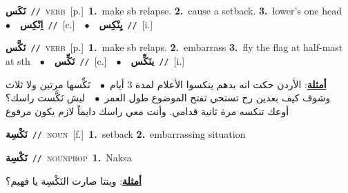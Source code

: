 \documentclass[10pt,a4paper,twoside]{article} %
\begin{document}
\begin{multicols}{2}
{\setlength\topsep{0pt}\textbf{\foreignlanguage{arabic}{نَكَس}}\ {\color{gray}\texttt{//}\color{black}}\ \textsc{verb}\ [p.]\ \textbf{1.}~make sb relapse.  \textbf{2.}~cause a setback.  \textbf{3.}~lower's one head\ \ $\bullet$\ \ \setlength\topsep{0pt}\textbf{\foreignlanguage{arabic}{اِنْكِس}}\ {\color{gray}\texttt{//}\color{black}}\ [c.]\ \ $\bullet$\ \ \setlength\topsep{0pt}\textbf{\foreignlanguage{arabic}{يِنْكِس}}\ {\color{gray}\texttt{//}\color{black}}\ [i.]\ } \vspace{2mm}

{\setlength\topsep{0pt}\textbf{\foreignlanguage{arabic}{نَكَّس}}\ {\color{gray}\texttt{//}\color{black}}\ \textsc{verb}\ [p.]\ \textbf{1.}~make sb relaps.  \textbf{2.}~embarrass  \textbf{3.}~fly the flag at half-mast at sth\ \ $\bullet$\ \ \setlength\topsep{0pt}\textbf{\foreignlanguage{arabic}{نَكِّس}}\ {\color{gray}\texttt{//}\color{black}}\ [c.]\ \ $\bullet$\ \ \setlength\topsep{0pt}\textbf{\foreignlanguage{arabic}{ينَكِّس}}\ {\color{gray}\texttt{//}\color{black}}\ [i.]\  \begin{flushright}\color{gray}\foreignlanguage{arabic}{\textbf{\underline{\foreignlanguage{arabic}{أمثلة}}}: الأردن حكت انه بدهم ينكسوا الأعلام لمدة 3 أيام\ $\bullet$\ \  نَكِّسها مرتين ولا ثلاث وشوف كيف بعدين رح تستحي تفتح الموضوع طول العمر\ $\bullet$\ \  ليش نَكَّست راسك؟ أوعك تنكسه مرة ثانية قدامي. وأنت معي راسك دايماً لازم يكون مرفوع}\end{flushright}\color{black}} \vspace{2mm}

{\setlength\topsep{0pt}\textbf{\foreignlanguage{arabic}{نَكْسِة}}\ {\color{gray}\texttt{//}\color{black}}\ \textsc{noun}\ [f.]\ \textbf{1.}~setback  \textbf{2.}~embarrassing situation\ } \vspace{2mm}

{\setlength\topsep{0pt}\textbf{\foreignlanguage{arabic}{نَكْسِة}}\ {\color{gray}\texttt{//}\color{black}}\ \textsc{noun\textunderscore prop}\ \textbf{1.}~Naksa\  \begin{flushright}\color{gray}\foreignlanguage{arabic}{\textbf{\underline{\foreignlanguage{arabic}{أمثلة}}}: وينتا صارت النَكْسِة يا فهيم؟}\end{flushright}\color{black}} \vspace{2mm}


\end{multicols}
\end{document}

